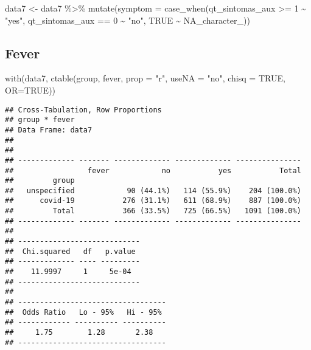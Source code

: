 \documentclass[
]{article}
\newenvironment{Shaded}{\begin{snugshade}}{\end{snugshade}}
\newcommand{\AttributeTok}[1]{\textcolor[rgb]{0.77,0.63,0.00}{#1}}
\newcommand{\ConstantTok}[1]{\textcolor[rgb]{0.00,0.00,0.00}{#1}}
\newcommand{\DecValTok}[1]{\textcolor[rgb]{0.00,0.00,0.81}{#1}}
\newcommand{\FunctionTok}[1]{\textcolor[rgb]{0.00,0.00,0.00}{#1}}
\newcommand{\NormalTok}[1]{#1}
\newcommand{\OtherTok}[1]{\textcolor[rgb]{0.56,0.35,0.01}{#1}}
\newcommand{\SpecialCharTok}[1]{\textcolor[rgb]{0.00,0.00,0.00}{#1}}
\newcommand{\StringTok}[1]{\textcolor[rgb]{0.31,0.60,0.02}{#1}}
\begin{document}
\begin{Shaded}
\begin{Highlighting}[]
\NormalTok{data7 }\OtherTok{\textless{}{-}}\NormalTok{  data7 }\SpecialCharTok{\%\textgreater{}\%}
  \FunctionTok{mutate}\NormalTok{(}\AttributeTok{symptom =} \FunctionTok{case\_when}\NormalTok{(qt\_sintomas\_aux }\SpecialCharTok{\textgreater{}=} \DecValTok{1} \SpecialCharTok{\textasciitilde{}} \StringTok{"yes"}\NormalTok{,}
\NormalTok{                             qt\_sintomas\_aux }\SpecialCharTok{==} \DecValTok{0} \SpecialCharTok{\textasciitilde{}} \StringTok{"no"}\NormalTok{,}
                             \ConstantTok{TRUE} \SpecialCharTok{\textasciitilde{}} \ConstantTok{NA\_character\_}\NormalTok{))}
\end{Highlighting}
\end{Shaded}

\hypertarget{fever}{%
\subsection{Fever}\label{fever}}

\begin{Shaded}
\begin{Highlighting}[]
\FunctionTok{with}\NormalTok{(data7, }\FunctionTok{ctable}\NormalTok{(group, fever, }\AttributeTok{prop =} \StringTok{"r"}\NormalTok{, }\AttributeTok{useNA =} \StringTok{"no"}\NormalTok{, }\AttributeTok{chisq =} \ConstantTok{TRUE}\NormalTok{, }\AttributeTok{OR=}\ConstantTok{TRUE}\NormalTok{))}
\end{Highlighting}
\end{Shaded}

\begin{verbatim}
## Cross-Tabulation, Row Proportions  
## group * fever  
## Data Frame: data7  
## 
## 
## ------------- ------- ------------- ------------- ---------------
##                 fever            no           yes           Total
##         group                                                    
##   unspecified            90 (44.1%)   114 (55.9%)    204 (100.0%)
##      covid-19           276 (31.1%)   611 (68.9%)    887 (100.0%)
##         Total           366 (33.5%)   725 (66.5%)   1091 (100.0%)
## ------------- ------- ------------- ------------- ---------------
## 
## ----------------------------
##  Chi.squared   df   p.value 
## ------------- ---- ---------
##    11.9997     1     5e-04  
## ----------------------------
## 
## ----------------------------------
##  Odds Ratio   Lo - 95%   Hi - 95% 
## ------------ ---------- ----------
##     1.75        1.28       2.38   
## ----------------------------------
\end{verbatim}
\end{document}
